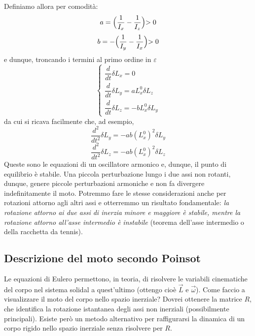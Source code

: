 \documentclass[a4paper,openany]{article}
\begin{document}
	Definiamo allora per comodità:
	\begin{equation}\label{key}
		a = \Bigl(\dfrac{1}{I_x}-\dfrac{1}{I_z}\Bigl) > 0 
	\end{equation}
	\begin{equation*}\label{key}
		b =- \Bigl(\dfrac{1}{I_y}-\dfrac{1}{I_x}\Bigl) > 0
	\end{equation*}
	e dunque, troncando i termini al primo ordine in $\varepsilon$
	\begin{equation}\label{key}
		\begin{cases}
			\dfrac{d}{dt}\delta L_x =0\\
			\dfrac{d}{dt}\delta L_y = aL_x^{0}\delta L_z \\
			\dfrac{d}{dt}\delta L_z =- bL_x^{0}\delta L_y
		\end{cases}
	\end{equation}
	da cui si ricava facilmente che, ad esempio,
	\begin{equation}\label{key}
		\dfrac{d^2}{dt^2}\delta L_y = -ab (L_x^{0})^2\delta L_y
	\end{equation}
	\begin{equation}\label{key}
		\dfrac{d^2}{dt^2}\delta L_z = -ab (L_x^{0})^2\delta L_z
	\end{equation}
	Queste sono le equazioni di un oscillatore armonico e, dunque, il punto di equilibrio è stabile. Una piccola perturbazione lungo i due assi non rotanti, dunque, genere piccole perturbazioni armoniche e non fa divergere indefinitamente il moto. Potremmo fare le stesse considerazioni anche per rotazioni attorno agli altri assi e otterremmo un risultato fondamentale: \textit{la rotazione attorno ai due assi di inerzia minore e maggiore è stabile, mentre la rotazione attorno all'asse intermedio è instabile} (teorema dell'asse intermedio o della racchetta da tennis).
	\subsection{Descrizione del moto secondo Poinsot}
	Le equazioni di Eulero permettono, in teoria, di risolvere le variabili cinematiche del corpo nel sistema solidal a quest'ultimo (ottengo cioè $\vec{L}$ e $\vec{\omega}$). Come faccio a visualizzare il moto del corpo nello spazio inerziale? Dovrei ottenere la matrice $R$, che identifica la rotazione istantanea degli assi non inerziali (possibilmente principali). Esiste però un metodo alternativo per raffigurarsi la dinamica di un corpo rigido nello spazio inerziale senza risolvere per $R$.
	
\end{document}
